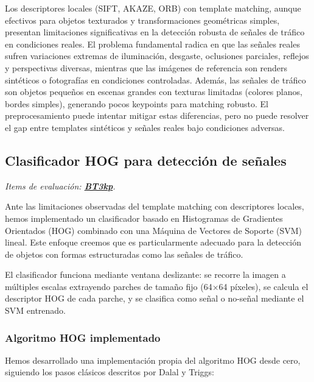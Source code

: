 \documentclass[11pt,a4paper]{article}
\begin{document}
Los descriptores locales (SIFT, AKAZE, ORB) con template matching, aunque efectivos para objetos 
texturados y transformaciones geométricas simples, presentan limitaciones significativas en la detección robusta de señales de tráfico en 
condiciones reales. El problema fundamental radica en que las señales reales sufren variaciones extremas de 
iluminación, desgaste, oclusiones parciales, reflejos y perspectivas diversas, mientras que las imágenes de referencia son
renders sintéticos o fotografías en condiciones controladas. Además, las señales de tráfico son objetos pequeños en escenas grandes con texturas 
limitadas (colores planos, bordes simples), generando pocos keypoints para matching robusto. El preprocesamiento puede intentar mitigar estas diferencias, 
pero no puede resolver el gap entre templates sintéticos y señales reales bajo condiciones adversas.

\subsection{Clasificador HOG para detección de señales}

\textit{Items de evaluación: \underline{\textbf{BT3kp}}.}

Ante las limitaciones observadas del template matching con descriptores locales, 
hemos implementado un clasificador basado en Histogramas de Gradientes Orientados (HOG)
combinado con una Máquina de Vectores de Soporte (SVM) lineal. Este enfoque creemos que es particularmente 
adecuado para la detección de objetos con formas estructuradas como las señales de tráfico.

El clasificador funciona mediante ventana deslizante: se recorre la imagen a múltiples 
escalas extrayendo parches de tamaño fijo (64$\times$64 píxeles), se calcula el descriptor HOG 
de cada parche, y se clasifica como señal o no-señal mediante el SVM entrenado.

\subsubsection{Algoritmo HOG implementado}

Hemos desarrollado una implementación propia del algoritmo HOG desde cero, siguiendo 
los pasos clásicos descritos por Dalal y Triggs\cite{dalal2005}:
\end{document}
